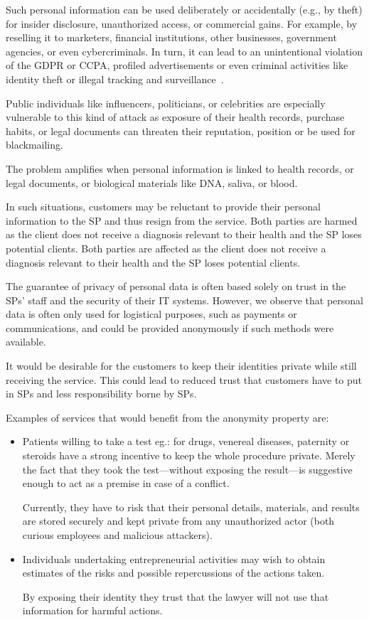 \documentclass[pdftex,twocolumn,epjc3]{svjour3}
\begin{document}
Such personal information can be used deliberately or accidentally (e.g., by theft) 
for insider disclosure, unauthorized access, or commercial gains. For example, by reselling it to marketers, financial institutions, other businesses, government agencies, or even cybercriminals. 
In turn, it can lead to an unintentional violation of the GDPR or CCPA, profiled advertisements or even criminal activities like identity theft or illegal tracking and surveillance~\cite{smithInformationPrivacyResearch2011}.

Public individuals like influencers, politicians, or celebrities are especially vulnerable to this kind of attack as exposure of their health records, purchase habits, or legal documents can threaten their reputation, position or be used for blackmailing.

The problem amplifies when personal information is linked to health records, or legal documents, or biological materials like DNA, saliva, or blood.

In such situations, customers may be reluctant to provide their personal information to the SP and thus resign from the service. Both parties are harmed as the client does not receive a diagnosis relevant to their health and the SP loses potential clients. Both parties are affected as the client does not receive a diagnosis relevant to their health and the SP loses potential clients.

The guarantee of privacy of personal data is often based solely on trust in the SPs' staff and the security of their IT systems. However, we observe that personal data is often only used for logistical purposes, such as payments or communications, and could be provided anonymously if such methods were available.

It would be desirable for the customers to keep their identities private while still receiving the service. This could lead to reduced trust that customers have to put in SPs and less responsibility borne by SPs.

Examples of services that would benefit from the anonymity property are:
\begin{itemize}
    \item Patients willing to take a test eg.: for drugs, venereal diseases, paternity or steroids have a strong incentive to keep the whole procedure private. Merely the fact that they took the test—without exposing the result—is suggestive enough to act as a premise in case of a conflict.

Currently, they have to risk that their personal details, materials, and results are stored securely and kept private from any unauthorized actor (both curious employees and malicious attackers).

\item Individuals undertaking entrepreneurial activities may wish to obtain estimates of the risks and possible repercussions of the actions taken.

By exposing their identity they trust that the lawyer will not use that information for harmful actions.
\end{itemize}
\end{document}
